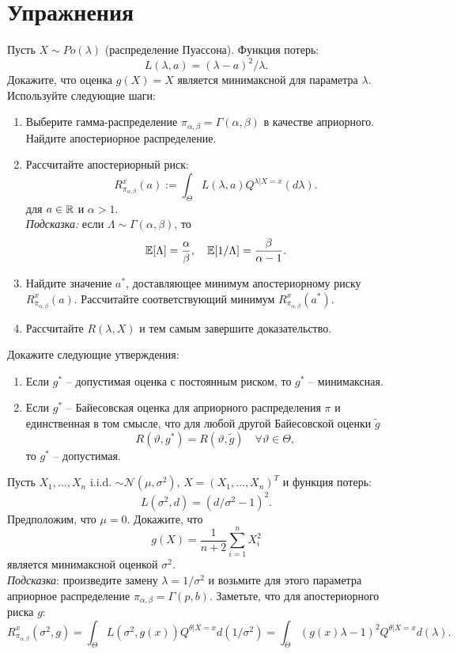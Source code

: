 \section*{Упражнения}
\begin{exc}
	Пусть $X \sim Po(\lambda)$ (распределение Пуассона). Функция потерь:
	\[ L(\lambda, a) = (\lambda - a)^2/\lambda. \]
	Докажите, что оценка $g(X)=X$ является минимаксной для параметра $\lambda$. Используйте следующие шаги:
	\begin{enumerate}
		\item Выберите гамма-распределение $\pi_{\alpha, \beta}=\Gamma(\alpha, \beta)$ в качестве априорного. Найдите апостериорное распределение.
		\item Рассчитайте апостериорный риск:
		\[ R_{\pi_{\alpha, \beta}}^x(a) := \int_{\Theta} L(\lambda, a) Q^{\lambda | X = x} (d\lambda). \]
		для $a \in \mathbb{R}$ и $\alpha>1$. \\
		\subitem \textit{\textit{Подсказка}:} если $\Lambda \sim \Gamma(\alpha, \beta)$, то 
		\[ \mathbb{E}[\Lambda]=\frac{\alpha}{\beta}, \quad \mathbb{E}[1/\Lambda]=\frac{\beta}{\alpha-1}. \]
		\item Найдите значение $a^*$, доставляющее минимум апостериорному риску $R_{\pi_{\alpha, \beta}}^x(a)$. Рассчитайте соответствующий минимум $R_{\pi_{\alpha, \beta}}^x(a^*)$.
		\item Рассчитайте $R(\lambda, X)$ и тем самым завершите доказательство.
	\end{enumerate}
\end{exc}

\begin{exc}
	Докажите следующие утверждения:
	\begin{enumerate}
		\item Если $g^*$ -- допустимая оценка с постоянным риском, то $g^*$ -- минимаксная.
		\item Если $g^*$ -- Байесовская оценка для априорного распределения $\pi$ и единственная в том смысле, что для любой другой Байесовской оценки $\tilde{g}$
		\[ R(\vartheta, g^*)=R(\vartheta, \tilde{g}) \quad \forall \vartheta \in \Theta, \]
		то $g^*$ -- допустимая.
	\end{enumerate}
\end{exc}

\begin{exc}
	Пусть $X_1, \dots, X_n$ i.i.d. $\sim \mathcal{N}(\mu, \sigma^2)$, $X=(X_1, \dots, X_n)^T$ и функция потерь:
	\[ L(\sigma^2,d)=(d/\sigma^2-1)^2. \]
	Предположим, что $\mu=0$. Докажите, что
	\[ g(X)=\frac{1}{n+2}\sum_{i=1}^{n}X_i^2 \]
	является минимаксной оценкой $\sigma^2$. \\
	\subitem \textit{Подсказка}: произведите замену $\lambda=1/\sigma^2$ и возьмите для этого параметра априорное распределение $\pi_{\alpha, \beta}=\Gamma(p, b)$. Заметьте, что для апостериорного риска $g$:
	\[R_{\pi_{\alpha, \beta}}^x(\sigma^2, g)=\int_{\Theta}L(\sigma^2, g(x))Q^{\theta|X=x}d(1/\sigma^2)=\int_{\Theta}(g(x)\lambda-1)^2Q^{\theta|X=x}d(\lambda).\]
\end{exc}